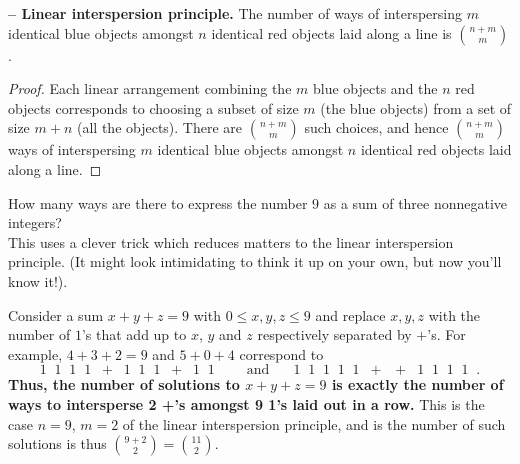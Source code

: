 \documentclass[11pt,dvipsnames]{book}
\numberwithin{equation}{section} %
\numberwithin{figure}{section} %
\numberwithin{table}{section} %
\begin{document}
\begin{proposition}\label{interspersion} {\bf -- Linear interspersion principle.}
The number of ways of interspersing $m$ identical blue objects amongst $n$ identical red objects laid along a line is $n+m \choose m$.
\end{proposition}
\begin{proof}
Each linear arrangement combining the $m$ blue objects and the $n$ red objects corresponds to choosing a subset of size $m$ (the blue objects) from a set of size $m+n$ (all the objects). There are $n+m \choose m$ such choices, and hence $n+m \choose m$ ways of interspersing $m$ identical blue objects amongst $n$ identical red objects laid along a line.
\end{proof}


\begin{example}
\label{ex:1+'s}
How many ways are there to express the number $9$ as a sum of three nonnegative integers? \\

This uses a clever trick which reduces matters to the linear interspersion principle. (It might look intimidating to think it up on your own, but now you'll know it!). 

Consider a sum $x+y+z=9$ with $0\leq x,y,z\leq 9$ and replace $x,y,z$ with the number of $1$'s that add up to $x$, $y$ and $z$ respectively separated by $+$'s. For example, $4+3+2=9$ and $5+0+4$ correspond to
\[
1\;\; 1\;\; 1\;\; 1\;\; + \;\;1\;\; 1\;\; 1\;\; +\;\;1\;\; 1\;\; \;\;\;\;\;\mbox{ and }\;\;\;\;\; 
1\;\; 1\;\; 1\;\; 1\;\;  1 \;\; + \;\; + \;\; 1\;\; 1\;\; 1\;\; 1\;\; .
\]
{\bf Thus, the number of solutions to $x+y+z=9$ is exactly the number of ways to intersperse 2 +'s amongst 9 1's laid out in a row.} This is the case $n=9$, $m=2$ of the linear interspersion principle, and is the number of such solutions is thus ${9+2 \choose 2} = {11\choose 2}$.
\end{example}
\end{document}
